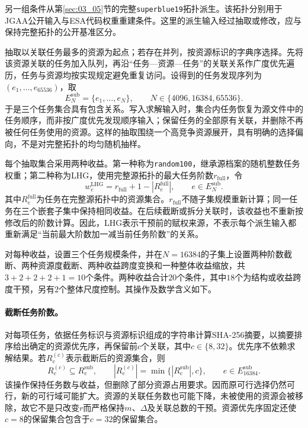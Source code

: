 另一组条件从第\ref{sec:03_05}节的完整\texttt{superblue19}拓扑派生。该拓扑分别用于JGAA公开输入与ESA代码权重重建条件\cite{GrossmannJRS2026,ReinstadtlerFPU2025}。这里的派生输入经过抽取或修改，应与保持完整拓扑的公开基准区分。

抽取以关联任务最多的资源为起点；若存在并列，按资源标识的字典序选择。先将该资源关联的任务加入队列，再沿“任务---资源---任务”的关联关系作广度优先遍历，任务与资源均按实现规定避免重复访问。设得到的任务发现序列为$(e_1,\ldots,e_{65536})$，取
\begin{equation}
 E_N^{\mathrm{sub}}=\{e_1,\ldots,e_N\},
 \qquad N\in\{4096,16384,65536\}.
 \label{s0306:public_subsets}
\end{equation}
于是三个任务集合具有包含关系。写入求解输入时，集合内任务恢复为源文件中的任务顺序，而非按广度优先发现顺序输入；保留任务的全部原有关联，并删除不再被任何任务使用的资源。这样的抽取围绕一个高竞争资源展开，具有明确的选择偏向，不是对完整拓扑的均匀随机抽样。

每个抽取集合采用两种收益。第一种称为\texttt{random100}，继承源档案的随机整数任务权重；第二种称为LHG，使用完整源拓扑的最大任务阶数$r_{\mathrm{full}}$，令
\begin{equation}
 w_e^{\mathrm{LHG}}=r_{\mathrm{full}}+1-|R_e^{\mathrm{full}}|,
 \qquad e\in E_N^{\mathrm{sub}}.
 \label{s0306:public_lhg}
\end{equation}
其中$R_e^{\mathrm{full}}$为任务在完整源拓扑中的资源集合。$r_{\mathrm{full}}$不随子集规模重新计算；同一任务在三个嵌套子集中保持相同收益。在后续截断或拆分关联时，该收益也不重新按修改后的阶数计算。因此，LHG表示干预前的赋权来源，不表示每个派生输入都重新满足“当前最大阶数加一减当前任务阶数”的关系。

对每种收益，设置三个任务规模条件，并在$N=16384$的子集上设置两种阶数截断、两种资源度截断、两种收益跨度变换和一种整体收益缩放，共$3+2+2+2+1=10$个条件。两种收益合计$20$个条件，其中$18$个为结构或收益跨度干预，另有$2$个整体尺度控制。其操作及数学含义如下。

\paragraph{截断任务阶数。}
对每项任务，依据任务标识与资源标识组成的字符串计算SHA-256摘要，以摘要排序给出确定的资源优先序，再保留前$c$个关联，其中$c\in\{8,32\}$。优先序不依赖求解结果。若$R_e^{(c)}$表示截断后的资源集合，则
\begin{equation}
 R_e^{(c)}\subseteq R_e^{\mathrm{sub}},\qquad
 |R_e^{(c)}|=\min\{|R_e^{\mathrm{sub}}|,c\},
 \qquad e\in E_{16384}^{\mathrm{sub}}.
 \label{s0306:rank_cap}
\end{equation}
该操作保持任务数与收益，但删除了部分资源占用要求。因而原可行选择仍然可行，新的可行域可能扩大。资源的关联任务数也可能下降，未被使用的资源会被移除，故它不是只改变$r$而严格保持$m$、$\Delta$及关联总数的干预。资源优先序固定还使$c=8$的保留集合包含于$c=32$的保留集合。

